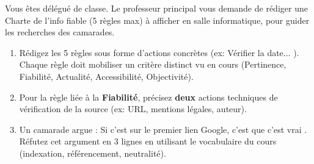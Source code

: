 \documentclass[11pt]{article}
\begin{document}
\begin{exercice}
Vous êtes délégué de classe. Le professeur principal vous demande de rédiger une \og Charte de l'info fiable \fg (5 règles max) à afficher en salle informatique, pour guider les recherches des camarades.
\begin{enumerate}
    \item Rédigez les 5 règles sous forme d'actions concrètes (ex: \og Vérifier la date... \fg). Chaque règle doit mobiliser un critère distinct vu en cours (Pertinence, Fiabilité, Actualité, Accessibilité, Objectivité).
    \item Pour la règle liée à la \textbf{Fiabilité}, précisez \textbf{deux} actions techniques de vérification de la source (ex: URL, mentions légales, auteur).
    \item Un camarade argue : \og Si c'est sur le premier lien Google, c'est que c'est vrai \fg. Réfutez cet argument en 3 lignes en utilisant le vocabulaire du cours (indexation, référencement, neutralité).
\end{enumerate}
\end{exercice}
\end{document}
